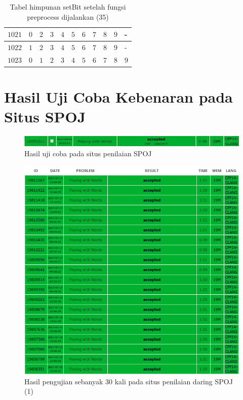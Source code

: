 \begin{appendices}
\begin{table}[H]
\begin{tabular} {|l|l|l|l|l|l|l|l|l|l|l|}
  		$ 1021 $ & $ 0 $ &$ 2 $ &$ 3 $ &$ 4 $ &$ 5 $ &$ 6 $ &$ 7 $ &$ 8 $ &$ 9 $ & -   \\ \hline
  		$ 1022 $ & $ 1 $ &$ 2 $ &$ 3 $ &$ 4 $ &$ 5 $ &$ 6 $ &$ 7 $ &$ 8 $ &$ 9 $ & -   \\ \hline
  		$ 1023 $ & $ 0 $ &$ 1 $ &$ 2 $ &$ 3 $ &$ 4 $ &$ 5 $ &$ 6 $ &$ 7 $ &$ 8 $ &$ 9 $  \\ \hline
  	\end{tabular}\caption{Tabel himpunan setBit setelah fungsi preprocess dijalankan (35)}
  	\label{tab:setbit_35}
  \end{table}
	
  \chapter{Hasil Uji Coba Kebenaran pada Situs SPOJ}
  \setcounter{figure}{0}
  \renewcommand{\thetable}{B.\arabic{table}}
  \renewcommand{\thefigure}{B.\arabic{figure}}
  
  \begin{figure}[H]
  	\centerline{ \includegraphics[scale=0.5]{assets/images/jpg/single-submission.jpg}}
  	\caption{Hasil uji coba pada situs penilaian SPOJ}
  	\label{figure:best_submission}
  \end{figure}
  
  \begin{figure}[H]
  	\centerline{ \includegraphics[scale=0.6]{assets/images/ujisubmission1.png}}
  	\caption{Hasil pengujian sebanyak 30 kali pada situs penilaian daring SPOJ (1)}
  	\label{figure:submission1}
  \end{figure}
  

\end{appendices}
